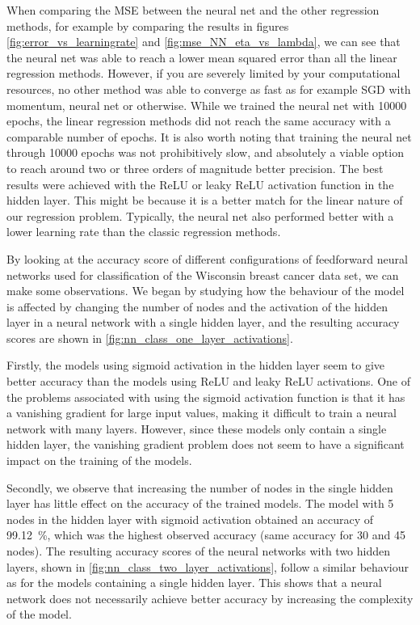 \documentclass[12pt]{article}
\begin{document}
When comparing the MSE between the neural net and the other regression methods, for example by comparing the results in figures \ref{fig:error_vs_learningrate} and \ref{fig:mse_NN_eta_vs_lambda}, we can see that the neural net was able to reach a lower mean squared error than all the linear regression methods. However, if you are severely limited by your computational resources, no other method was able to converge as fast as for example SGD with momentum, neural net or otherwise. While we trained the neural net with 10000 epochs, the linear regression methods did not reach the same accuracy with a comparable number of epochs. It is also worth noting that training the neural net through 10000 epochs was not prohibitively slow, and absolutely a viable option to reach around two or three orders of magnitude better precision. The best results were achieved with the ReLU or leaky ReLU activation function in the hidden layer. This might be because it is a better match for the linear nature of our regression problem. Typically, the neural net also performed better with a lower learning rate than the classic regression methods. 

By looking at the accuracy score of different configurations of feedforward neural networks used for classification of the Wisconsin breast cancer data set, we can make some observations. We began by studying how the behaviour of the model is affected by changing the number of nodes and the activation of the hidden layer in a neural network with a single hidden layer, and the resulting accuracy scores are shown in \autoref{fig:nn_class_one_layer_activations}. 

Firstly, the models using sigmoid activation in the hidden layer seem to give better accuracy than the models using ReLU and leaky ReLU activations. One of the problems associated with using the sigmoid activation function is that it has a vanishing gradient for large input values, making it difficult to train a neural network with many layers. However, since these models only contain a single hidden layer, the vanishing gradient problem does not seem to have a significant impact on the training of the models.

Secondly, we observe that increasing the number of nodes in the single hidden layer has little effect on the accuracy of the trained models. The model with \num{5} nodes in the hidden layer with sigmoid activation obtained an accuracy of \SI{99.12}{\%}, which was the highest observed accuracy (same accuracy for \num{30} and \num{45} nodes). The resulting accuracy scores of the neural networks with two hidden layers, shown in \autoref{fig:nn_class_two_layer_activations}, follow a similar behaviour as for the models containing a single hidden layer. This shows that a neural network does not necessarily achieve better accuracy by increasing the complexity of the model.
\end{document}

